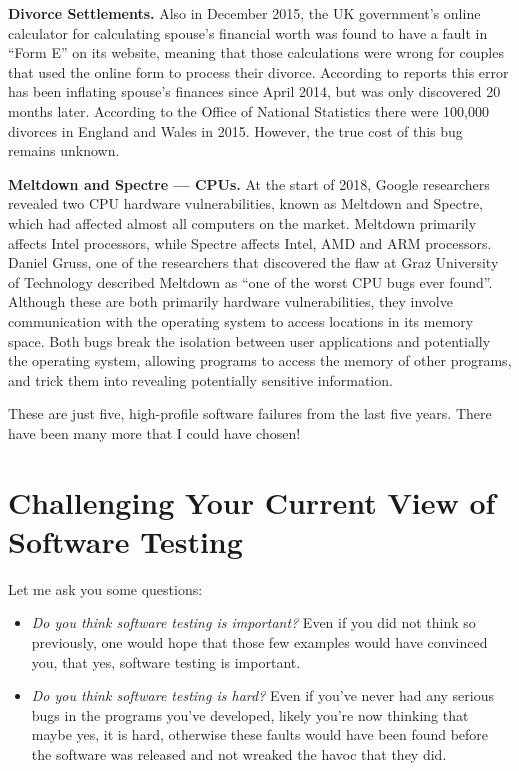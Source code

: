 {\bf Divorce Settlements.}
Also in December 2015, the UK government's online calculator for calculating
spouse's financial worth was found to have a fault in ``Form E'' on its website,
meaning that those calculations were wrong for couples that used the online form
to process their divorce. According to reports this error has been inflating
spouse's finances since April 2014, but was only discovered 20 months
later. According to the Office of National Statistics there were 100,000
divorces in England and Wales in 2015. However, the true cost of this bug remains
unknown.

{\bf Meltdown and Spectre --- CPUs.}
At the start of 2018, Google researchers revealed two CPU hardware
vulnerabilities, known as Meltdown and Spectre, which had affected almost all
computers on the market. Meltdown primarily affects Intel processors, while
Spectre affects Intel, AMD and ARM processors. Daniel Gruss, one of the
researchers that discovered the flaw at Graz University of Technology described
Meltdown as ``one of the worst CPU bugs ever found''. 
%
Although these are both primarily hardware vulnerabilities, they involve
communication with the operating system to access locations in its memory space.
%
Both bugs break the isolation between user applications and potentially the
operating system, allowing programs to access the memory of other programs, and
trick them into revealing potentially sensitive information.


These are just five, high-profile software failures from the last five years.
There have been many more that I could have chosen! 

\newpage


\section{Challenging Your Current View of Software Testing}

Let me ask you some questions:

\begin{itemize}
    \item {\it Do you think software testing is important?}
    Even if you did not think so previously, one would hope that those few
    examples would have convinced you, that yes, software testing is important.
    
    \item {\it Do you think software testing is hard?}
    Even if you've never had any serious bugs in the programs you've developed,
    likely you're now thinking that maybe yes, it is hard, otherwise these
    faults would have been found before the software was released and not
    wreaked the havoc that they did.
\end{itemize}

